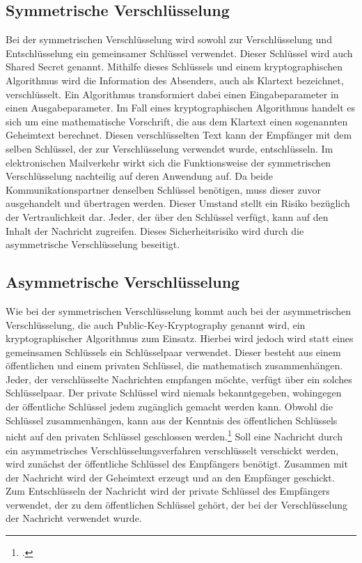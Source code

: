 \documentclass  [paper=a4,
				fontsize=12pt,
				listof=totoc,
				bibliography=totoc
				]{scrreprt}
\begin{document}
			\subsection{Symmetrische Verschlüsselung}
				Bei der symmetrischen Verschlüsselung wird sowohl zur Verschlüsselung und Entschlüsselung ein gemeinsamer Schlüssel verwendet. Dieser Schlüssel wird auch Shared Secret genannt. Mithilfe dieses Schlüssels und einem kryptographischen Algorithmus wird die Information des Absenders, auch als Klartext bezeichnet, verschlüsselt. Ein Algorithmus transformiert dabei einen Eingabeparameter in einen Ausgabeparameter. Im Fall eines kryptographischen Algorithmus handelt es sich um eine mathematische Vorschrift, die aus dem Klartext einen sogenannten Geheimtext berechnet. Diesen verschlüsselten Text kann der Empfänger mit dem selben Schlüssel, der zur Verschlüsselung verwendet wurde, entschlüsseln.
				Im elektronischen Mailverkehr wirkt sich die Funktionsweise der symmetrischen Verschlüsselung nachteilig auf deren Anwendung auf. Da beide Kommunikationspartner denselben Schlüssel benötigen, muss dieser zuvor ausgehandelt und übertragen werden. Dieser Umstand stellt ein Risiko bezüglich der Vertraulichkeit dar. Jeder, der über den Schlüssel verfügt, kann auf den Inhalt der Nachricht zugreifen. Dieses Sicherheitsrisiko wird durch die asymmetrische Verschlüsselung beseitigt.
			\subsection{Asymmetrische Verschlüsselung}
				Wie bei der symmetrischen Verschlüsselung kommt auch bei der asymmetrischen Verschlüsselung, die auch Public-Key-Kryptography genannt wird, ein kryptographischer Algorithmus zum Einsatz. Hierbei wird jedoch wird statt eines gemeinsamen Schlüssels ein Schlüsselpaar verwendet. Dieser besteht aus einem öffentlichen und einem privaten Schlüssel, die mathematisch zusammenhängen. Jeder, der verschlüsselte Nachrichten empfangen möchte, verfügt über ein solches Schlüsselpaar. Der private Schlüssel wird niemals bekanntgegeben, wohingegen der öffentliche Schlüssel jedem zugänglich gemacht werden kann. Obwohl die Schlüssel zusammenhängen, kann aus der Kenntnis des öffentlichen Schlüssels nicht auf den privaten Schlüssel geschlossen werden.\footcite[S. 177]{Schmeh2013}
				Soll eine Nachricht durch ein asymmetrisches Verschlüsselungsverfahren verschlüsselt verschickt werden, wird zunächst der öffentliche Schlüssel des Empfängers benötigt. Zusammen mit der Nachricht wird der Geheimtext erzeugt und an den Empfänger geschickt. Zum Entschlüsseln der Nachricht wird der private Schlüssel des Empfängers verwendet, der zu dem öffentlichen Schlüssel gehört, der bei der Verschlüsselung der Nachricht verwendet wurde.
				
\end{document}
